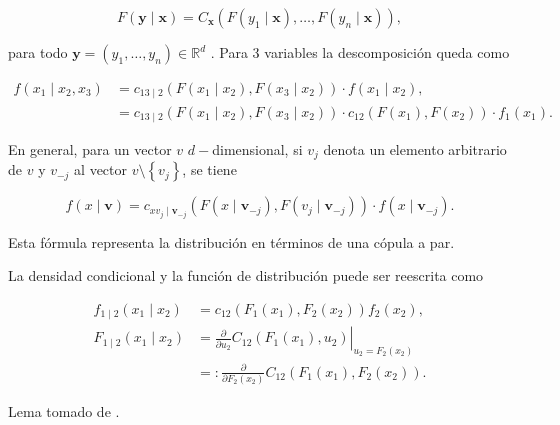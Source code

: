 \vspace{-0.5cm}
\begin{equation}
    F(\mathbf{y} \mid \mathbf{x})= C_{\mathbf{x}}\left(F\left(y_{1} \mid \mathbf{x}\right), \ldots, F\left(y_{n} \mid \mathbf{x}\right)\right),
\end{equation}

 para todo $\mathbf{y}=\left(y_{1}, \ldots, y_{n}\right) \in \mathbb{R}^d$ \cite{arxiv.2403.12565}. Para $3$ variables la descomposición queda como

\vspace{-0.5cm}
\begin{equation}\label{3var}
    \begin{split}
        f\left(x_1 \mid x_2, x_3\right) & = c_{13 \mid 2} (F\left(x_1 \mid x_2\right), F\left(x_3 \mid x_2\right) ) \cdot f\left(x_1 \mid x_2\right), \\
        & = c_{13 \mid 2}(F\left(x_1 \mid x_2\right), F\left(x_3 \mid x_2\right)) \cdot c_{12}( F\left(x_1\right), F\left(x_2\right)) \cdot f_1(x_1).
    \end{split}
\end{equation}

En general, para un vector $v$ $d-$dimensional, si $v_j$ denota un elemento arbitrario de $v$ y $v_{-j}$ al vector $v \setminus \left\{ v_j \right\}$, se tiene

\begin{equation}\label{fact}
    f(x \mid \boldsymbol{v}) = c_{x v_j \mid \boldsymbol{v}_{-j}} (  F \left(x \mid \boldsymbol{v}_{-j}\right), F\left(v_j \mid \boldsymbol{v}_{-j}\right) ) \cdot f\left(x \mid \boldsymbol{v}_{-j}\right).
\end{equation}

Esta fórmula representa la distribución en términos de una cópula a par.

\begin{lema}La densidad condicional y la función de distribución puede ser reescrita como

\vspace{-0.5cm}
\begin{equation}
    \begin{aligned}
    f_{1 \mid 2}\left(x_1 \mid x_2\right) & =c_{12}\left(F_1\left(x_1\right), F_2\left(x_2\right)\right) f_2\left(x_2\right), \\
    F_{1 \mid 2}\left(x_1 \mid x_2\right) & =\left.\frac{\partial}{\partial u_2} C_{12}\left(F_1\left(x_1\right), u_2\right)\right|_{u_2=F_2\left(x_2\right)} \\
    & =: \frac{\partial}{\partial F_2\left(x_2\right)} C_{12}\left(F_1\left(x_1\right), F_2\left(x_2\right)\right) .
    \end{aligned}
\end{equation}

Lema tomado de \cite[pag 20]{czadoAnalyzing}.
\end{lema}

